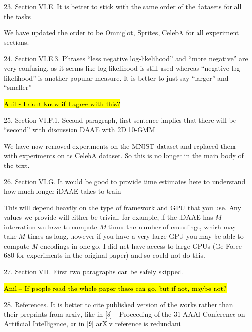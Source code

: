 \documentclass{article}
\begin{document}
{\color{blue}
23. Section VI.E. It is better to stick with the same order of the datasets for all the tasks\\
}

{\color{red} We have updated the order to be Omniglot, Sprites, CelebA for all experiment sections.\\}

{\color{blue}
24. Section VI.E.3. Phrases ``less negative log-likelihood'' and ``more negative'' are very confusing, as it seems like log-likelihood is still used whereas ``negative log-likelihood'' is another popular measure. It is better to just say ``larger'' and ``smaller''\\
}

\hl{Anil - I dont know if I agree with this?\\}


{\color{blue}
25. Section VI.F.1. Second paragraph, first sentence implies that there will be ``second'' with discussion DAAE with 2D 10-GMM\\
}

{\color{red} We have now removed experiments on the MNIST dataset and replaced them with experiments on te CelebA dataset. So this is no longer in the main body of the text.\\}

{\color{blue}
26. Section VI.G. It would be good to provide time estimates here to understand how much longer iDAAE takes to train\\
}

{\color{red} This will depend heavily on the type of framework and GPU that you use. Any values we provide will either be trivial, for example, if the iDAAE has $M$ interration we have to compute $M$ times the number of encodings, which may take $M$ times as long, however if you have a very large GPU you may be able to compute $M$ encodings in one go. I did not have access to large GPUs (Ge Force 680 for experiments in the original paper) and so could not do this.\\}

{\color{blue}
27. Section VII. First two paragraphs can be safely skipped.\\
}

\hl{Anil -- If people read the whole paper these can go, but if not, maybe not?\\}

{\color{blue}
28. References. It is better to cite published version of the works rather than their preprints from arxiv, like in [8] - Proceeding of the 31 AAAI Conference on Artificial Intelligence, or in [9] arXiv reference is redundant\\
}
\end{document}
